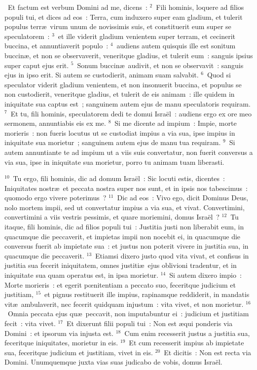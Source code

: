 ~Et factum est verbum Domini ad me, dicens~:
${}^{2}$~Fili hominis, loquere ad filios populi tui, et dices ad eos~: Terra, cum induxero super eam gladium, et tulerit populus terr\ae\ virum unum de novissimis suis, et constituerit eum super se speculatorem~:
${}^{3}$~et ille viderit gladium venientem super terram, et cecinerit buccina, et annuntiaverit populo~:
${}^{4}$~audiens autem quisquis ille est sonitum buccin\ae , et non se observaverit, veneritque gladius, et tulerit eum~: sanguis ipsius super caput ejus erit.
${}^{5}$~Sonum buccin\ae\ audivit, et non se observavit~: sanguis ejus in ipso erit. Si autem se custodierit, animam suam salvabit.
${}^{6}$~Quod si speculator viderit gladium venientem, et non insonuerit buccina, et populus se non custodierit, veneritque gladius, et tulerit de eis animam~: ille quidem in iniquitate sua captus est~; sanguinem autem ejus de manu speculatoris requiram.
${}^{7}$~Et tu, fili hominis, speculatorem dedi te domui Isra\"el~: audiens ergo ex ore meo sermonem, annuntiabis eis ex me.
${}^{8}$~Si me dicente ad impium~: Impie, morte morieris~: non fueris locutus ut se custodiat impius a via sua, ipse impius in iniquitate sua morietur~; sanguinem autem ejus de manu tua requiram.
${}^{9}$~Si autem annuntiante te ad impium ut a viis suis convertatur, non fuerit conversus a via sua, ipse in iniquitate sua morietur, porro tu animam tuam liberasti.


${}^{10}$~Tu ergo, fili hominis, dic ad domum Isra\"el~: Sic locuti estis, dicentes~: Iniquitates nostr\ae\ et peccata nostra super nos sunt, et in ipsis nos tabescimus~: quomodo ergo vivere poterimus~?
${}^{11}$~Dic ad eos~: Vivo ego, dicit Dominus Deus, nolo mortem impii, sed ut convertatur impius a via sua, et vivat. Convertimini, convertimini a viis vestris pessimis, et quare moriemini, domus Isra\"el~?
${}^{12}$~Tu itaque, fili hominis, dic ad filios populi tui~: Justitia justi non liberabit eum, in quacumque die peccaverit, et impietas impii non nocebit ei, in quacumque die conversus fuerit ab impietate sua~: et justus non poterit vivere in justitia sua, in quacumque die peccaverit.
${}^{13}$~Etiamsi dixero justo quod vita vivat, et confisus in justitia sua fecerit iniquitatem, omnes justiti\ae\ ejus oblivioni tradentur, et in iniquitate sua quam operatus est, in ipsa morietur.
${}^{14}$~Si autem dixero impio~: Morte morieris~: et egerit pœnitentiam a peccato suo, feceritque judicium et justitiam,
${}^{15}$~et pignus restituerit ille impius, rapinamque reddiderit, in mandatis vit\ae\ ambulaverit, nec fecerit quidquam injustum~: vita vivet, et non morietur.
${}^{16}$~Omnia peccata ejus qu\ae\ peccavit, non imputabuntur ei~: judicium et justitiam fecit~: vita vivet.
${}^{17}$~Et dixerunt filii populi tui~: Non est \ae qui ponderis via Domini~: et ipsorum via injusta est.
${}^{18}$~Cum enim recesserit justus a justitia sua, feceritque iniquitates, morietur in eis.
${}^{19}$~Et cum recesserit impius ab impietate sua, feceritque judicium et justitiam, vivet in eis.
${}^{20}$~Et dicitis~: Non est recta via Domini. Unumquemque juxta vias suas judicabo de vobis, domus Isra\"el.


